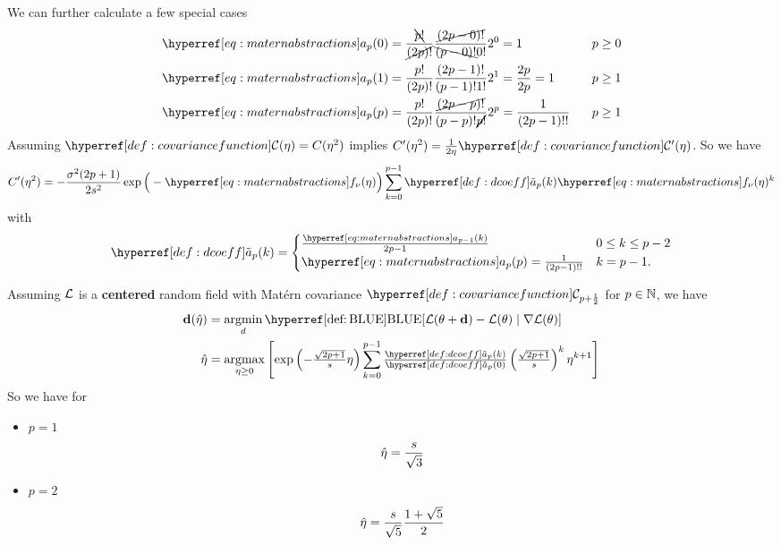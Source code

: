 We can further calculate a few special cases
\begin{align}
	\label{eq: mcoeff 0}
	\mcoeff(0)
	&= \frac{\bcancel{p!}}{\cancel{(2p)!}}\frac{\cancel{(2p-0)!}}{\bcancel{(p-0)!}0!}2^0
	= 1
	\qquad
	&& p\ge 0\\
	\label{eq: mcoeff 1}
	\mcoeff(1)
	&= \frac{p!}{(2p)!}\frac{(2p-1)!}{(p-1)!1!}2^1 = \frac{2p}{2p} = 1 
	\qquad
	&& p\ge 1\\
	\mcoeff(p)
	\label{eq: mcoeff p}
	&= \frac{p!}{(2p)!}\frac{\cancel{(2p-p)!}}{(p-p)!\cancel{p!}}2^p
	= \frac{1}{(2p-1)!!}
	&& p \ge 1
\end{align}
%
Assuming \(\C(\lr) = \sqC(\lr^2)\) implies \(\sqC'(\lr^2) = \frac1{2\lr}\C'(\lr)\).
So we have
\begin{equation*}
	\sqC'(\lr^2)
	=-\frac{\sigma^2(2p+1)}{2s^2}
	\exp\Big(-\mf(\lr)\Big)\sum_{k=0}^{p-1} \dcoeff(k)\mf(\lr)^k
\end{equation*}
with
\begin{equation*}
	\dcoeff(k) = \begin{cases}
		\frac{\mcoeff[p-1](k)}{2p-1} & 0 \le k \le p-2\\
		\mcoeff(p) = \frac{1}{(2p-1)!!} & k=p-1.
	\end{cases}
\end{equation*}

\begin{theorem}
	Assuming \(\mathcal{L}\) is a \textbf{centered} random field with Matérn covariance
	\(\C_{p+\frac12}\) for \(p\in\mathbb{N}\), we have
	\begin{align*}
		\step(\hat{\lr})
		&= \argmin_{d}
		\BLUE[\Loss(\param + \step) - \Loss(\param)\mid \grad\Loss(\param)]\\
		\hat{\lr}
		&= \argmax_{\lr\ge0}\left[
			\exp\left(-\tfrac{\sqrt{2p+1}}{s}\lr\right)
			\sum_{k=0}^{p-1}\tfrac{\dcoeff(k)}{\dcoeff(0)}\left(\tfrac{\sqrt{2p+1}}{s}\right)^k \lr^{k+1}
		\right]
	\end{align*}
	So we have for
	\begin{itemize}
		\item \(p=1\)
		\begin{equation*}
			\hat{\eta} = \frac{s}{\sqrt{3}}
		\end{equation*}

		\item \(p=2\)
		\begin{equation*}
			\hat{\eta}
			= \frac{s}{\sqrt{5}}\frac{1+\sqrt{5}}2
		\end{equation*}
	\end{itemize}
\end{theorem}

